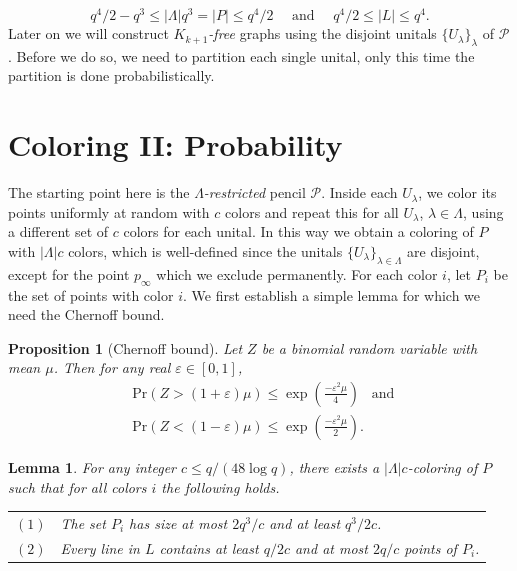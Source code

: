 \documentclass[12pt]{article}
\newtheorem{lemma}{Lemma}
\newtheorem{proposition}{Proposition}
\theoremstyle{definition}
\begin{document}
	\begin{equation*}
		q^4/2-q^3\leq |\Lambda|q^3 = |P| \leq q^4/2 \quad \text {     and       } \quad q^4/2 \leq |L| \leq q^4.
	\end{equation*}
	Later on we will construct  $K_{k+1}$\textit{-free} graphs using the disjoint unitals $\{U_\lambda\}_\lambda$ of $\mathcal{P}$. Before we do so, we need to partition each single unital, only this time the partition is done probabilistically. 
	
	
	\section{Coloring II: Probability} \label{Coloring II: Probability}
	The starting point here is the $\Lambda$\textit{-restricted} pencil $\mathcal{P}$. Inside each $U_\lambda$, we color its points uniformly at random with $c$ colors and repeat this for all $U_\lambda$, $\lambda \in \Lambda$, using a different set of $c$ colors for each unital. In this way we obtain a coloring of $P$ with $|\Lambda|c$ colors, which is well-defined since the unitals $\{U_\lambda\}_{\lambda \in \Lambda}$ are disjoint, except for the point $p_{\infty}$ which we exclude permanently. For each color $i$, let $P_i$ be the set of points with color $i$. We first establish a simple lemma for which we need the Chernoff bound.
	
	\begin{proposition}[Chernoff bound]
		Let $Z$ be a binomial random variable with mean $\mu$. Then for any real $\varepsilon \in [0,1]$,
		\begin{align*}
			&\mathrm{Pr}(Z > (1+\varepsilon)\mu) \leq \exp\left(\frac{-\varepsilon^2\mu}{4}\right) \,\,\,\text{ and } \\
			&\mathrm{Pr}(Z < (1-\varepsilon)\mu) \leq \exp\left(\frac{-\varepsilon^2\mu}{2}\right).
		\end{align*}
	\end{proposition} 
	
	\begin{lemma}\label{lem:coloringpoints}
		For any integer $c \leq q/(48\log q)$, there exists a $|\Lambda|c$\textit{-coloring} of $P$ such that for all colors $i$ the following holds.
		\begin{center}
			\begin{tabular}{lp{5in}}
				$(1)$ & The set $P_i$ has size at most $2 q^3/c$ and at least $q^3/2c$. \\
				$(2)$ & Every line in $L$ contains at least $q/2c$ and at most $2q/c$ points of $P_i$. \\
			\end{tabular}
		\end{center}
	\end{lemma}
	
\end{document}
